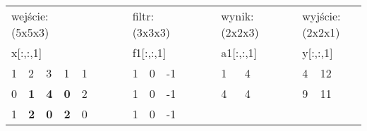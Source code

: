 \begin{table}[h]
\centering
\caption[Short Heading]{}
\begin{tabular}{lllllllllllllllllllllll}
\multicolumn{5}{l}{wejście: (5x5x3)}                                                                                                                   &  &  &                       & \multicolumn{3}{l}{filtr: (3x3x3)}                                          &  &  &                       & \multicolumn{4}{l}{wynik: (2x2x3)}                     &                       & \multicolumn{4}{l}{wyjście: (2x2x1)}                   \\
\multicolumn{5}{l}{x{[}:,:,1{]}}                                                                                                                       &  &  &                       & \multicolumn{3}{l}{f1{[}:,:,1{]}}                                           &  &  &                       & \multicolumn{2}{l}{a1{[}:,:,1{]}}                &  &  &                       & \multicolumn{2}{l}{y{[}:,:,1{]}}                 &  &  \\ \cline{1-5} \cline{9-11} \cline{15-16} \cline{20-21}
\multicolumn{1}{|l|}{1} & \multicolumn{1}{l|}{2}          & \multicolumn{1}{l|}{3}          & \multicolumn{1}{l|}{1}          & \multicolumn{1}{l|}{1} &  &  & \multicolumn{1}{l|}{} & \multicolumn{1}{l|}{1}  & \multicolumn{1}{l|}{0}  & \multicolumn{1}{l|}{-1} &  &  & \multicolumn{1}{l|}{} & \multicolumn{1}{l|}{1}  & \multicolumn{1}{l|}{4} &  &  & \multicolumn{1}{l|}{} & \multicolumn{1}{l|}{4} & \multicolumn{1}{l|}{12} &  &  \\ \cline{1-5} \cline{9-11} \cline{15-16} \cline{20-21}
\multicolumn{1}{|l|}{0} & \multicolumn{1}{l|}{\textbf{1}} & \multicolumn{1}{l|}{\textbf{4}} & \multicolumn{1}{l|}{\textbf{0}} & \multicolumn{1}{l|}{2} &  &  & \multicolumn{1}{l|}{} & \multicolumn{1}{l|}{1}  & \multicolumn{1}{l|}{0}  & \multicolumn{1}{l|}{-1} &  &  & \multicolumn{1}{l|}{} & \multicolumn{1}{l|}{4}  & \multicolumn{1}{l|}{4} &  &  & \multicolumn{1}{l|}{} & \multicolumn{1}{l|}{9} & \multicolumn{1}{l|}{11} &  &  \\ \cline{1-5} \cline{9-11} \cline{15-16} \cline{20-21}
\multicolumn{1}{|l|}{1} & \multicolumn{1}{l|}{\textbf{2}} & \multicolumn{1}{l|}{\textbf{0}} & \multicolumn{1}{l|}{\textbf{2}} & \multicolumn{1}{l|}{0} &  &  & \multicolumn{1}{l|}{} & \multicolumn{1}{l|}{1}  & \multicolumn{1}{l|}{0}  & \multicolumn{1}{l|}{-1} &  &  &                       &                         &                        &  &  &                       &                        &                         &  &  \\ \cline{1-5} \cline{9-11}

\end{tabular}
\end{table}
